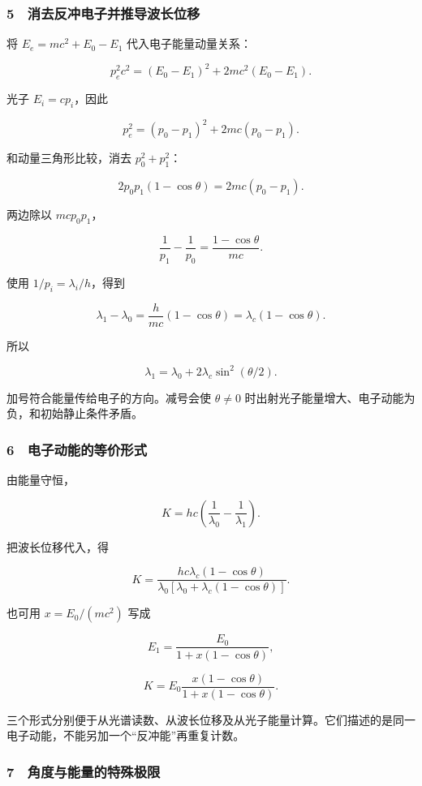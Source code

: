 \documentclass[12pt,a4paper,fontset=fandol]{ctexart}
\begin{document}
\subsubsection{5　消去反冲电子并推导波长位移}\label{ux6d88ux53bbux53cdux51b2ux7535ux5b50ux5e76ux63a8ux5bfcux6ce2ux957fux4f4dux79fb}

将 \(E_e=mc^2+E_0-E_1\) 代入电子能量动量关系：

\[p_e^2c^2=(E_0-E_1)^2+2mc^2(E_0-E_1).\]

光子 \(E_i=cp_i\)，因此

\[p_e^2=(p_0-p_1)^2+2mc(p_0-p_1).\]

和动量三角形比较，消去 \(p_0^2+p_1^2\)：

\[2p_0p_1(1-\cos\theta)=2mc(p_0-p_1).\]

两边除以 \(mcp_0p_1\)，

\[\frac1{p_1}-\frac1{p_0}=\frac{1-\cos\theta}{mc}.\]

使用 \(1/p_i=\lambda_i/h\)，得到

\[\boxed{\lambda_1-\lambda_0=
\frac h{mc}(1-\cos\theta)=\lambda_c(1-\cos\theta).}\]

所以

\[\boxed{\lambda_1=\lambda_0+2\lambda_c\sin^2(\theta/2).}\]

加号符合能量传给电子的方向。减号会使 \(\theta\ne0\)
时出射光子能量增大、电子动能为负，和初始静止条件矛盾。

\subsubsection{6　电子动能的等价形式}\label{ux7535ux5b50ux52a8ux80fdux7684ux7b49ux4ef7ux5f62ux5f0f}

由能量守恒，

\[\boxed{K=hc\left(\frac1{\lambda_0}-\frac1{\lambda_1}\right).}\]

把波长位移代入，得

\[\boxed{K=
\frac{hc\lambda_c(1-\cos\theta)}
{\lambda_0[\lambda_0+\lambda_c(1-\cos\theta)]}.}\]

也可用 \(x=E_0/(mc^2)\) 写成

\[E_1=\frac{E_0}{1+x(1-\cos\theta)},\]

\[\boxed{K=E_0\frac{x(1-\cos\theta)}{1+x(1-\cos\theta)}.}\]

三个形式分别便于从光谱读数、从波长位移及从光子能量计算。它们描述的是同一电子动能，不能另加一个``反冲能''再重复计数。

\subsubsection{7　角度与能量的特殊极限}\label{ux89d2ux5ea6ux4e0eux80fdux91cfux7684ux7279ux6b8aux6781ux9650}
\end{document}
